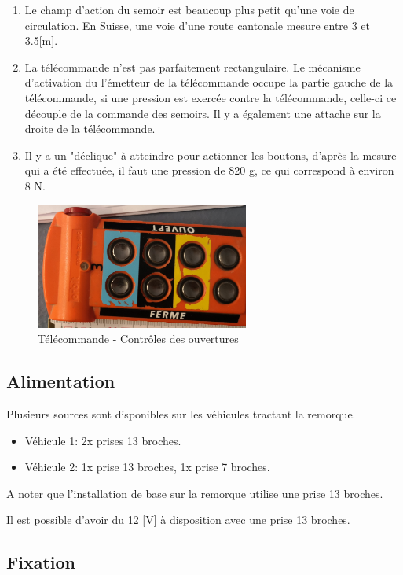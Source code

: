 \begin{enumerate}
    \item{Le champ d'action du semoir est beaucoup plus petit qu'une voie de circulation. En Suisse, une voie d'une route cantonale mesure entre 3 et 3.5[m].}
    \item{La télécommande n'est pas parfaitement rectangulaire. Le mécanisme d'activation du l'émetteur de la télécommande occupe la partie gauche de la télécommande,
                si une pression est exercée contre la télécommande, celle-ci ce découple de la commande des semoirs. Il y a également une attache sur la droite de la télécommande.}
    \item{Il y a un "déclique" à atteindre pour actionner les boutons, d'après la mesure qui a été effectuée, il faut une pression de 820 \si{\gram}, ce qui correspond à environ 8 \si{\newton}}.
\end{enumerate}

\begin{figure}[H]
    \centering
    \includegraphics[width=7cm]{assets/figures/telecommande2.jpg}
    \caption{Télécommande - Contrôles des ouvertures}
\end{figure}

\subsection{Alimentation}
Plusieurs sources sont disponibles sur les véhicules tractant la remorque.
\begin{itemize}
    \item{Véhicule 1: 2x prises 13 broches.}
    \item{Véhicule 2: 1x prise 13 broches, 1x prise 7 broches.}
\end{itemize}
A noter que l'installation de base sur la remorque utilise une prise 13 broches.

Il est possible d'avoir du 12 [V] à disposition avec une prise 13 broches.

\subsection{Fixation}
